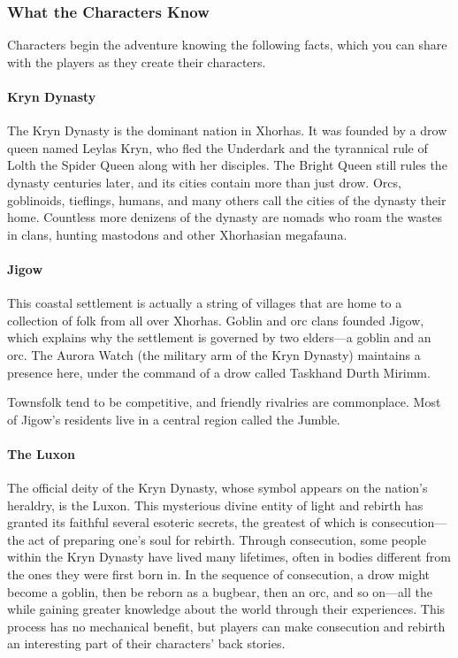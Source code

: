 \documentclass[letterpaper, 11pt, bg=full, twocolumn]{dndbook}
\begin{document}
\subsubsection{What the Characters Know}

Characters begin the adventure knowing the following facts, which you can share with the players as they create their characters.

\paragraph{Kryn Dynasty}

The Kryn Dynasty is the dominant nation in Xhorhas. It was founded by a drow queen named Leylas Kryn, who fled the Underdark and the tyrannical rule of Lolth the Spider Queen along with her disciples. The Bright Queen still rules the dynasty centuries later, and its cities contain more than just drow. Orcs, goblinoids, tieflings, humans, and many others call the cities of the dynasty their home. Countless more denizens of the dynasty are nomads who roam the wastes in clans, hunting mastodons and other Xhorhasian megafauna.

\paragraph{Jigow}

This coastal settlement is actually a string of villages that are home to a collection of folk from all over Xhorhas. Goblin and orc clans founded Jigow, which explains why the settlement is governed by two elders---a goblin and an orc. The Aurora Watch (the military arm of the Kryn Dynasty) maintains a presence here, under the command of a drow called Taskhand Durth Mirimm.

Townsfolk tend to be competitive, and friendly rivalries are commonplace. Most of Jigow's residents live in a central region called the Jumble.

\paragraph{The Luxon}

The official deity of the Kryn Dynasty, whose symbol appears on the nation's heraldry, is the Luxon. This mysterious divine entity of light and rebirth has granted its faithful several esoteric secrets, the greatest of which is consecution---the act of preparing one's soul for rebirth. Through consecution, some people within the Kryn Dynasty have lived many lifetimes, often in bodies different from the ones they were first born in. In the sequence of consecution, a drow might become a goblin, then be reborn as a bugbear, then an orc, and so on---all the while gaining greater knowledge about the world through their experiences. This process has no mechanical benefit, but players can make consecution and rebirth an interesting part of their characters' back stories.
\end{document}
